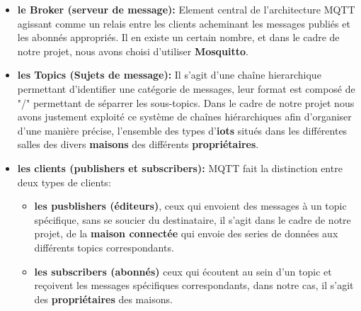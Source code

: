 \documentclass[10pt, a4paper]{report}
\begin{document}
	\begin{itemize}
		\item \textbf{le Broker (serveur de message):} Element central de l'architecture MQTT agissant comme un relais entre les clients acheminant les messages publiés et les abonnés appropriés. Il en existe un certain nombre, et dans le cadre de notre projet, nous avons choisi d'utiliser \textbf{Mosquitto}.
		
		\item \textbf{les Topics (Sujets de message):} Il s'agit d'une chaîne hierarchique permettant d'identifier une catégorie de messages, leur format est composé de "/" permettant de séparrer les sous-topics. Dans le cadre de notre projet nous avons justement exploité ce système de chaînes hiérarchiques afin d'organiser d'une manière précise, l'ensemble des types d'\textbf{iots} situés dans les différentes salles des divers \textbf{maisons} des différents \textbf{propriétaires}. 
		
		\item \textbf{les clients (publishers et subscribers):} MQTT fait la distinction entre deux types de clients: 
		\begin{itemize}
			\item \textbf{les pusblishers (éditeurs)}, ceux qui envoient des messages à un topic spécifique, sans se soucier du destinataire, il s'agit dans le cadre de notre projet, de la \textbf{maison connectée} qui envoie des series de données aux différents topics correspondants. 
			
			\item \textbf{les subscribers (abonnés)} ceux qui écoutent au sein d'un topic et reçoivent les messages spécifiques correspondants, dans notre cas, il s'agit des \textbf{propriétaires} des maisons.
		\end{itemize}
	\end{itemize}
	\vspace{0.5cm}
	
\end{document}
